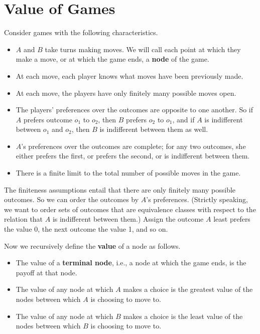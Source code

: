 \documentclass[
  11pt,
  letterpaper,
]{scrbook}
\providecommand{\tightlist}{%
  \setlength{\itemsep}{0pt}\setlength{\parskip}{0pt}}
\begin{document}
\section{Value of Games}\label{sec-value-of-games}

Consider games with the following characteristics.

\begin{itemize}
\tightlist
\item
  \(A\) and \(B\) take turns making moves. We will call each point at
  which they make a move, or at which the game ends, a \textbf{node} of
  the game.
\item
  At each move, each player knows what moves have been previously made.
\item
  At each move, the players have only finitely many possible moves open.
\item
  The players' preferences over the outcomes are opposite to one
  another. So if \(A\) prefers outcome \(o_1\) to \(o_2\), then \(B\)
  prefers \(o_2\) to \(o_1\), and if \(A\) is indifferent between
  \(o_1\) and \(o_2\), then \(B\) is indifferent between them as well.
\item
  \(A\)'s preferences over the outcomes are complete; for any two
  outcomes, she either prefers the first, or prefers the second, or is
  indifferent between them.
\item
  There is a finite limit to the total number of possible moves in the
  game.
\end{itemize}

The finiteness assumptions entail that there are only finitely many
possible outcomes. So we can order the outcomes by \(A\)'s preferences.
(Strictly speaking, we want to order sets of outcomes that are
equivalence classes with respect to the relation that \(A\) is
indifferent between them.) Assign the outcome \(A\) least prefers the
value 0, the next outcome the value 1, and so on.

Now we recursively define the \textbf{value} of a node as follows.

\begin{itemize}
\tightlist
\item
  The value of a \textbf{terminal node}, i.e., a node at which the game
  ends, is the payoff at that node.
\item
  The value of any node at which \(A\) makes a choice is the greatest
  value of the nodes between which \(A\) is choosing to move to.
\item
  The value of any node at which \(B\) makes a choice is the least value
  of the nodes between which \(B\) is choosing to move to.
\end{itemize}
\end{document}
